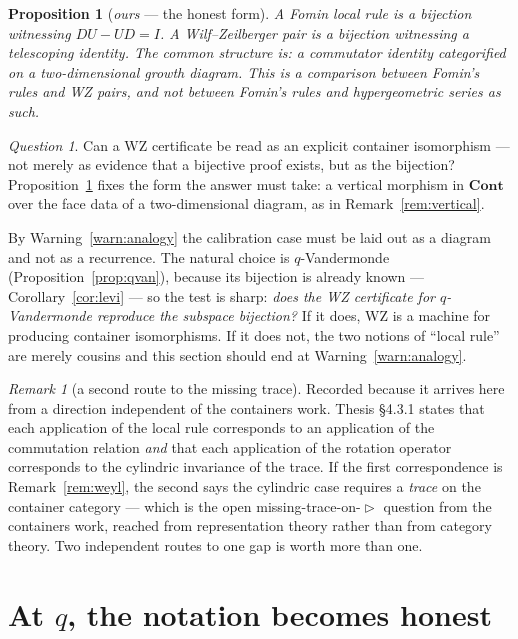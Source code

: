 \documentclass[11pt,a4paper]{article}
\newtheorem{proposition}[theorem]{Proposition}
\theoremstyle{definition}
\theoremstyle{remark}
\newtheorem{remark}[theorem]{Remark}
\newtheorem{question}[theorem]{Question}
\newcommand{\cat}[1]{\mathbf{#1}}
\newcommand{\Cont}{\cat{Cont}}
\newcommand{\con}{\mathrel{\vartriangleright}}
\begin{document}
\begin{proposition}[\emph{ours} --- the honest form]\label{prop:honest}
A Fomin local rule is a bijection witnessing $DU - UD = I$. A Wilf--Zeilberger pair is
a bijection witnessing a telescoping identity. The common structure is: \emph{a
commutator identity categorified on a two-dimensional growth diagram}. This is a
comparison between Fomin's rules and WZ \emph{pairs}, and not between Fomin's rules
and hypergeometric series as such.
\end{proposition}

\begin{question}\label{q:wz}
Can a WZ certificate be read as an explicit container isomorphism --- not merely as
evidence that a bijective proof exists, but as the bijection? Proposition~\ref{prop:honest}
fixes the form the answer must take: a vertical morphism in $\Cont$ over the face data
of a two-dimensional diagram, as in Remark~\ref{rem:vertical}.

By Warning~\ref{warn:analogy} the calibration case must be laid out as a diagram and
not as a recurrence. The natural choice is $q$-Vandermonde
(Proposition~\ref{prop:qvan}), because its bijection is already known ---
Corollary~\ref{cor:levi} --- so the test is sharp: \emph{does the WZ certificate for
$q$-Vandermonde reproduce the subspace bijection?} If it does, WZ is a machine for
producing container isomorphisms. If it does not, the two notions of ``local rule''
are merely cousins and this section should end at Warning~\ref{warn:analogy}.
\end{question}

\begin{remark}[a second route to the missing trace]\label{rem:trace}
Recorded because it arrives here from a direction independent of the containers work.
Thesis \S4.3.1 states that each application of the local rule corresponds to an
application of the commutation relation \emph{and} that each application of the
rotation operator corresponds to the cylindric invariance of the trace. If the first
correspondence is Remark~\ref{rem:weyl}, the second says the cylindric case requires a
\emph{trace} on the container category --- which is the open
missing-trace-on-$\con$ question from the containers work, reached from
representation theory rather than from category theory. Two independent routes to one
gap is worth more than one.
\end{remark}

\section{At $q$, the notation becomes honest}
\end{document}
